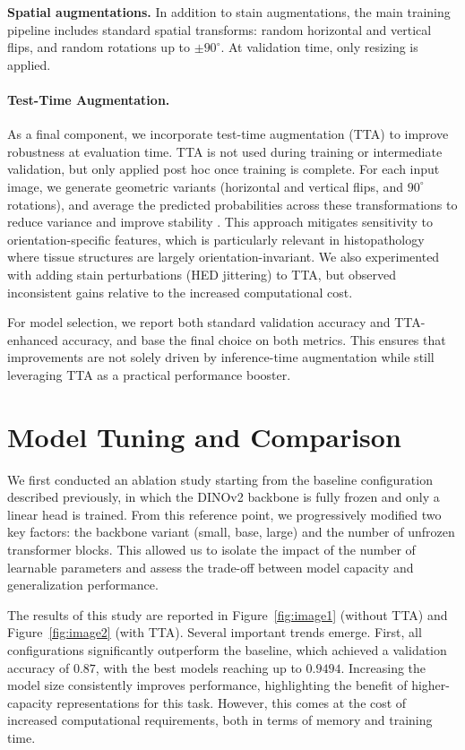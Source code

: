 \documentclass{midl}
\begin{document}
\textbf{Spatial augmentations.} In addition to stain augmentations, the main training pipeline includes standard spatial transforms: random horizontal and vertical flips, and random rotations up to $\pm 90^\circ$. At validation time, only resizing is applied.

\paragraph{Test-Time Augmentation.} 

As a final component, we incorporate test-time augmentation (TTA) \cite{shanmugam2021better} to improve robustness at evaluation time. TTA is not used during training or intermediate validation, but only applied post hoc once training is complete. For each input image, we generate geometric variants (horizontal and vertical flips, and $90^\circ$ rotations), and average the predicted probabilities across these transformations to reduce variance and improve stability \cite{lyzhov2020greedy}. This approach mitigates sensitivity to orientation-specific features, which is particularly relevant in histopathology where tissue structures are largely orientation-invariant. We also experimented with adding stain perturbations (HED jittering) to TTA, but observed inconsistent gains relative to the increased computational cost.

For model selection, we report both standard validation accuracy and TTA-enhanced accuracy, and base the final choice on both metrics. This ensures that improvements are not solely driven by inference-time augmentation while still leveraging TTA as a practical performance booster.

\section{Model Tuning and Comparison}

We first conducted an ablation study starting from the baseline configuration described previously, in which the DINOv2 backbone is fully frozen and only a linear head is trained. From this reference point, we progressively modified two key factors: the backbone variant (small, base, large) and the number of unfrozen transformer blocks. This allowed us to isolate the impact of the number of learnable parameters and assess the trade-off between model capacity and generalization performance.

The results of this study are reported in Figure~\ref{fig:image1} (without TTA) and Figure~\ref{fig:image2} (with TTA). Several important trends emerge. First, all configurations significantly outperform the baseline, which achieved a validation accuracy of $0.87$, with the best models reaching up to $0.9494$. Increasing the model size consistently improves performance, highlighting the benefit of higher-capacity representations for this task. However, this comes at the cost of increased computational requirements, both in terms of memory and training time.
\end{document}
